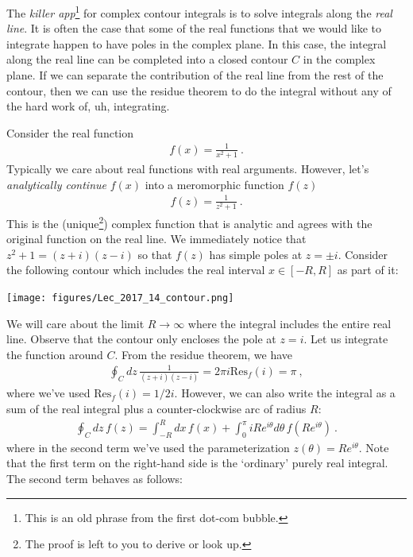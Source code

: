 The \emph{killer app}\footnote{This is an old phrase from the first dot-com bubble.} for complex contour integrals is to solve integrals along the \emph{real line}. It is often the case that some of the real functions that we would like to integrate happen to have poles in the complex plane. In this case, the integral along the real line can be completed into a closed contour $C$ in the complex plane. If we can separate the contribution of the real line from the rest of the contour, then we can use the residue theorem to do the integral without any of the hard work of, uh, integrating.

\begin{example}
Consider the real function
\begin{align}
	f(x) = \frac{1}{x^2 +1} \ .
\end{align}
Typically we care about real functions with real arguments. However, let's \emph{analytically continue} $f(x)$ into a meromorphic function $f(z)$
\begin{align}
	f(z) = \frac{1}{z^2+1} \ .
\end{align}
This is the (unique\footnote{The proof is left to you to derive or look up.}) complex function that is analytic and agrees with the original function on the real line. We immediately notice that $z^2+1 = (z+i)(z-i)$ so that $f(z)$ has simple poles at $z=\pm i$. Consider the following contour which includes the real interval $x\in [-R,R]$ as part of it:
\begin{center}
\texttt{[image: figures/Lec\_2017\_14\_contour.png]}
\end{center}
We will care about the limit $R\to \infty$ where the integral includes the entire real line.
Observe that the contour only encloses the pole at $z=i$. Let us integrate the function around $C$. From the residue theorem, we have
\begin{align}
	\oint_Cdz\, \frac{1}{(z+i)(z-i)} 
	= 2\pi i \text{Res}_f(i) 
	= \pi \ ,
\end{align}
where we've used $\text{Res}_f(i)=1/2i$. However, we can also write the integral as a sum of the real integral plus a counter-clockwise arc of radius $R$:
\begin{align}
	\oint_C dz\, f(z) = \int_{-R}^R dx\, f(x) 
	+ \int_0^\pi iR e^{i\theta} d\theta  \, f\left(Re^{i\theta}\right) \ .
\end{align}
where in the second term we've used the parameterization $z(\theta) = Re^{i\theta}$. Note that the first term on the right-hand side is the `ordinary' purely real integral. The second term behaves as follows:

\end{example}
